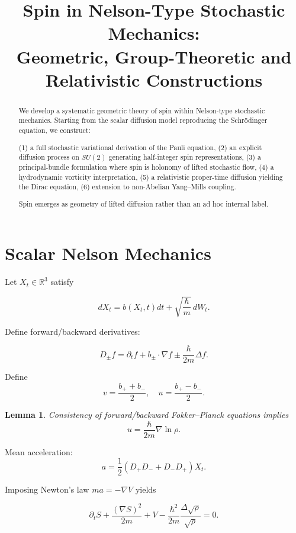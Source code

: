\documentclass[12pt]{article}
\title{Spin in Nelson-Type Stochastic Mechanics:\\
Geometric, Group-Theoretic and Relativistic Constructions}
\author{}
\date{}
\newtheorem{lemma}{Lemma}
\begin{document}
\maketitle

\begin{abstract}
We develop a systematic geometric theory of spin within Nelson-type
stochastic mechanics. Starting from the scalar diffusion model
reproducing the Schr\"odinger equation, we construct:

(1) a full stochastic variational derivation of the Pauli equation,
(2) an explicit diffusion process on $SU(2)$ generating half-integer
spin representations,
(3) a principal-bundle formulation where spin is holonomy of
lifted stochastic flow,
(4) a hydrodynamic vorticity interpretation,
(5) a relativistic proper-time diffusion yielding the Dirac equation,
(6) extension to non-Abelian Yang–Mills coupling.

Spin emerges as geometry of lifted diffusion rather than an
ad hoc internal label.
\end{abstract}

\tableofcontents

\section{Scalar Nelson Mechanics}

Let $X_t \in \mathbb{R}^3$ satisfy

\begin{equation}
dX_t = b(X_t,t)dt + \sqrt{\frac{\hbar}{m}}\,dW_t.
\end{equation}

Define forward/backward derivatives:

\[
D_\pm f = \partial_t f + b_\pm \cdot \nabla f
\pm \frac{\hbar}{2m}\Delta f.
\]

Define
\[
v = \frac{b_+ + b_-}{2},
\quad
u = \frac{b_+ - b_-}{2}.
\]

\begin{lemma}
Consistency of forward/backward Fokker–Planck equations implies
\[
u = \frac{\hbar}{2m}\nabla \ln \rho.
\]
\end{lemma}

Mean acceleration:
\[
a = \frac12(D_+D_- + D_-D_+)X_t.
\]

Imposing Newton's law $ma=-\nabla V$ yields

\[
\partial_t S + \frac{(\nabla S)^2}{2m}
+ V
- \frac{\hbar^2}{2m}
\frac{\Delta\sqrt{\rho}}{\sqrt{\rho}}=0.
\]
\end{document}
